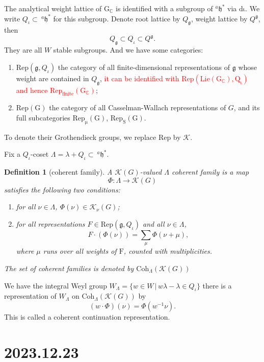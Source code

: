 \documentclass[12pt]{amsart}
\numberwithin{equation}{section}
\newtheorem{defn}[thm]{Definition}
\newcommand{\BC}{{\mathbb {C}}}
\newcommand{\fg}{\mathfrak{g}}
\newcommand{\fh}{\mathfrak{h}}
\newcommand{\set}[2]{\{#1\,|\,#2\}}
\begin{document}
The analytical weight lattice of $\mathrm{G_\BC}$ is identified with a subgroup of $^{a}\fh^*$ via $\mathrm{d\iota}$.
We write $Q_\iota \subset \  ^{a}\fh^*$ for this subgroup. Denote root lattice by $Q_\fg$,
weight lattice by $Q^\fg$, then $$Q_\fg \subset Q_\iota \subset Q^\fg.$$
They are all $W$ stable subgroups.
And we have some categories:
\begin{enumerate}
  \item $\mathrm{Rep}(\fg,Q_\iota)$ the category of all finite-dimensional representations of $\fg$ whose weight are contained in $Q_\fg$, \textcolor{red}{it can be identified with $\mathrm{Rep(Lie(G_\BC),Q_\iota)}$ and hence $\mathrm{Rep_{finite}(G_\BC)}$};
  \item $\mathrm{Rep(G)}$ the category of all Casselman-Wallach representations of $G$, and its full subcategories $\mathrm{Rep_\mu(G)}$, $\mathrm{Rep_S(G)}$.
\end{enumerate}
To denote their Grothendieck groups, we replace $\mathrm{Rep}$ by $\mathcal{K}$.


Fix a $Q_\iota$-coset $\Lambda = \lambda + Q_\iota \subset \  ^{a}\fh^*$.


\begin{defn}[coherent family]
  A $\mathcal{K}(G)$-valued $\Lambda$ coherent family is a map
  $$\varPhi : \Lambda \to \mathcal{K}(G)$$
  satisfies the following two conditions:
  \begin{enumerate}
    \item for all $\nu \in \Lambda$, $\varPhi(\nu) \in \mathcal{K}_{\nu}(G)$;
    \item for all representations $F \mathrm{ \in Rep}(\fg,Q_\iota)$ and all $\nu \in \Lambda$,
          $$F \cdot (\varPhi(\nu)) = \sum\limits_{\mu} \varPhi(\nu + \mu),$$
          where $\mu$ runs over all weights of $\mathrm{F}$, counted with multiplicities.
  \end{enumerate}
  The set of coherent families is denoted by $\mathrm{Coh}_\Lambda(\mathcal{K}(G))$
\end{defn}
We have the integral Weyl group $W_{\Lambda} = \set{w \in W}{w\lambda - \lambda \in Q_\iota}$
there is a representation of $W_\Lambda$ on $\mathrm{Coh}_\Lambda(\mathcal{K}(G))$ by
$$(w \cdot \varPhi)(\nu) = \varPhi (w^{-1}\nu).$$
This is called a coherent continuation representation.

\newpage


\section{2023.12.23}\label{2}
\end{document}
